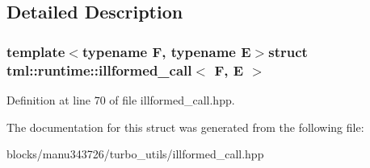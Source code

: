 \subsection{Detailed Description}
\subsubsection*{template$<$typename F, typename E$>$struct tml\+::runtime\+::illformed\+\_\+call$<$ F, E $>$}



Definition at line 70 of file illformed\+\_\+call.\+hpp.



The documentation for this struct was generated from the following file\+:\begin{DoxyCompactItemize}
\item 
blocks/manu343726/turbo\+\_\+utils/illformed\+\_\+call.\+hpp\end{DoxyCompactItemize}
